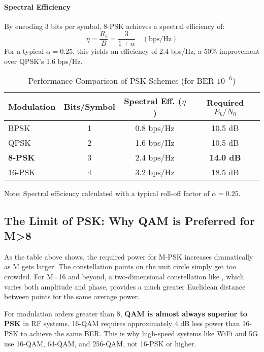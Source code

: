 \paragraph{Spectral Efficiency}
By encoding 3 bits per symbol, 8-PSK achieves a spectral efficiency of:
\begin{equation}
    \eta = \frac{R_b}{B} = \frac{3}{1+\alpha} \quad (\text{bps/Hz})
\end{equation}
For a typical $\alpha=0.25$, this yields an efficiency of 2.4 bps/Hz, a 50\% improvement over QPSK's 1.6 bps/Hz.

\begin{table}[H]
    \centering
    \caption{Performance Comparison of PSK Schemes (for BER $10^{-6}$)}
    \label{tab:psk-comparison}
    \begin{tabular}{@{}lccc@{}}
        \toprule
        \tableheaderfont Modulation & \tableheaderfont Bits/Symbol & \tableheaderfont Spectral Eff. ($\eta$) & \tableheaderfont Required $E_b/N_0$ \\
        \midrule
        BPSK & 1 & 0.8 bps/Hz & 10.5 dB \\
        QPSK & 2 & 1.6 bps/Hz & 10.5 dB \\
        \textbf{8-PSK} & 3 & 2.4 bps/Hz & \textbf{14.0 dB} \\
        16-PSK & 4 & 3.2 bps/Hz & 18.5 dB \\
        \bottomrule
    \end{tabular}
    \par\vspace{0.5em}
    \small Note: Spectral efficiency calculated with a typical roll-off factor of $\alpha=0.25$.
\end{table}


\subsection{The Limit of PSK: Why QAM is Preferred for M>8}

As the table above shows, the required power for M-PSK increases dramatically as M gets larger. The constellation points on the unit circle simply get too crowded. For M=16 and beyond, a two-dimensional constellation like , which varies both amplitude and phase, provides a much greater Euclidean distance between points for the same average power.
\begin{warningbox}
    For modulation orders greater than 8, \textbf{QAM is almost always superior to PSK} in RF systems. 16-QAM requires approximately 4 dB less power than 16-PSK to achieve the same BER. This is why high-speed systems like WiFi and 5G use 16-QAM, 64-QAM, and 256-QAM, not 16-PSK or higher.
\end{warningbox}


